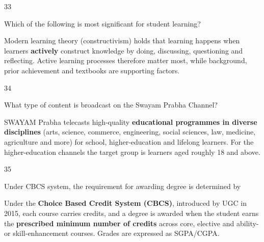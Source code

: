 \begin{question}{33}
{Which of the following is most significant for student learning?\par}
\begin{explain}
Modern learning theory (constructivism) holds that learning happens when learners \textbf{actively} construct knowledge by doing, discussing, questioning and reflecting. Active learning processes therefore matter most, while background, prior achievement and textbooks are supporting factors.
\end{explain}
\end{question}

\begin{question}{34}
{What type of content is broadcast on the Swayam Prabha Channel?\par}
\begin{explain}
SWAYAM Prabha telecasts high-quality \textbf{educational programmes in diverse disciplines} (arts, science, commerce, engineering, social sciences, law, medicine, agriculture and more) for school, higher-education and lifelong learners. For the higher-education channels the target group is learners aged roughly 18 and above.
\end{explain}
\end{question}

\begin{question}{35}
{Under CBCS system, the requirement for awarding degree is determined by\par}
\begin{explain}
Under the \textbf{Choice Based Credit System (CBCS)}, introduced by UGC in 2015, each course carries credits, and a degree is awarded when the student earns the \textbf{prescribed minimum number of credits} across core, elective and ability- or skill-enhancement courses. Grades are expressed as SGPA/CGPA.
\end{explain}
\end{question}

